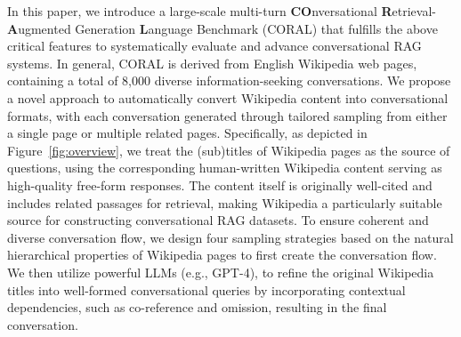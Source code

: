 \documentclass[11pt]{article}
\begin{document}
In this paper, we introduce a large-scale multi-turn \textbf{CO}nversational \textbf{R}etrieval-\textbf{A}ugmented Generation \textbf{L}anguage Benchmark (CORAL) that fulfills the above critical features to systematically evaluate and advance conversational RAG systems.
In general, CORAL is derived from English Wikipedia web pages, containing a total of 8,000 diverse information-seeking conversations. 
We propose a novel approach to automatically convert Wikipedia content into conversational formats, with each conversation generated through tailored sampling from either a single page or multiple related pages.
Specifically, as depicted in Figure~\ref{fig:overview}, we treat the (sub)titles of Wikipedia pages as the source of questions, using the corresponding human-written Wikipedia content serving as high-quality free-form responses. The content itself is originally well-cited and includes related passages for retrieval, making Wikipedia a particularly suitable source for constructing conversational RAG datasets.
To ensure coherent and diverse conversation flow, we design four sampling strategies based on the natural hierarchical properties of Wikipedia pages to first create the conversation flow. We then utilize powerful LLMs (e.g., GPT-4), to refine the original Wikipedia titles into well-formed conversational queries by incorporating contextual dependencies, such as co-reference and omission, resulting in the final conversation.
\end{document}
